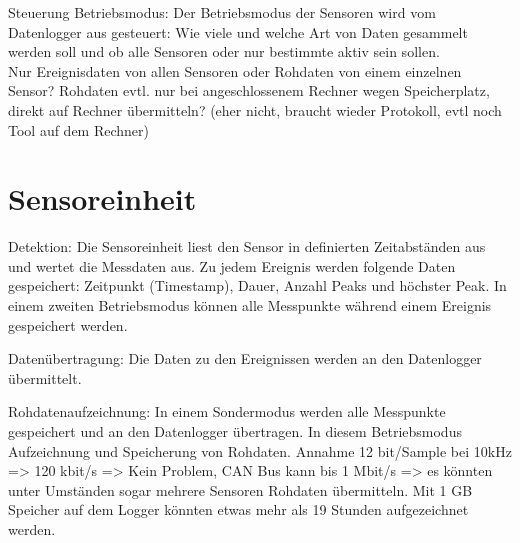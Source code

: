 \begin{description}
\item{Steuerung Betriebsmodus}: Der Betriebsmodus der Sensoren wird vom Datenlogger aus gesteuert: Wie viele und welche Art von Daten gesammelt werden soll und ob alle Sensoren oder nur bestimmte aktiv sein sollen. \\
Nur Ereignisdaten von allen Sensoren oder Rohdaten von einem einzelnen Sensor? Rohdaten evtl. nur bei angeschlossenem Rechner wegen Speicherplatz, direkt auf Rechner übermitteln? (eher nicht, braucht wieder Protokoll, evtl noch Tool auf dem Rechner)

\end{description}

\section{Sensoreinheit}
\begin{description}
\item{Detektion}: Die Sensoreinheit liest den Sensor in definierten Zeitabständen aus und wertet die Messdaten aus. Zu jedem Ereignis werden folgende Daten gespeichert: Zeitpunkt (Timestamp), Dauer, Anzahl Peaks und höchster Peak. In einem zweiten Betriebsmodus können alle Messpunkte während einem Ereignis gespeichert werden.

\item{Datenübertragung}: Die Daten zu den Ereignissen werden an den Datenlogger übermittelt.

\item{Rohdatenaufzeichnung}: In einem Sondermodus werden alle Messpunkte gespeichert und an den Datenlogger übertragen. In diesem Betriebsmodus  Aufzeichnung und Speicherung von Rohdaten. Annahme 12 bit/Sample bei 10kHz => 120 kbit/s => Kein Problem, CAN Bus kann bis 1 Mbit/s => es könnten unter Umständen sogar mehrere Sensoren Rohdaten übermitteln. Mit 1 GB Speicher auf dem Logger könnten etwas mehr als 19 Stunden aufgezeichnet werden.
\end{description}
